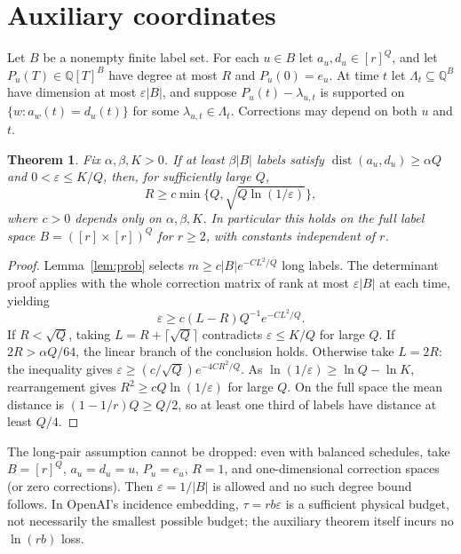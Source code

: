 \documentclass[11pt]{article}
\newtheorem{theorem}{Theorem}
\newcommand{\dist}{\operatorname{dist}}
\begin{document}
\section{Auxiliary coordinates}
Let $B$ be a nonempty finite label set. For each $u\in B$ let $a_u,d_u\in[r]^Q$, and let $P_u(T)\in\mathbb Q[T]^B$ have degree at most $R$ and $P_u(0)=e_u$. At time $t$ let $\Lambda_t\subseteq\mathbb Q^B$ have dimension at most $\varepsilon|B|$, and suppose $P_u(t)-\lambda_{u,t}$ is supported on $\{w:a_w(t)=d_u(t)\}$ for some $\lambda_{u,t}\in\Lambda_t$. Corrections may depend on both $u$ and $t$.
\begin{theorem}\label{thm:aux}
Fix $\alpha,\beta,K>0$. If at least $\beta|B|$ labels satisfy $\dist(a_u,d_u)\ge\alpha Q$ and $0<\varepsilon\le K/Q$, then, for sufficiently large $Q$,
\[R\ge c\min\{Q,\sqrt{Q\ln(1/\varepsilon)}\},\]
where $c>0$ depends only on $\alpha,\beta,K$. In particular this holds on the full label space $B=([r]\times[r])^Q$ for $r\ge2$, with constants independent of $r$.
\end{theorem}
\begin{proof}
Lemma~\ref{lem:prob} selects $m\ge c|B|e^{-CL^2/Q}$ long labels. The determinant proof applies with the whole correction matrix of rank at most $\varepsilon|B|$ at each time, yielding
\[\varepsilon\ge c(L-R)Q^{-1}e^{-CL^2/Q}.\]
If $R<\sqrt Q$, taking $L=R+\lceil\sqrt Q\rceil$ contradicts $\varepsilon\le K/Q$ for large $Q$. If $2R>\alpha Q/64$, the linear branch of the conclusion holds. Otherwise take $L=2R$: the inequality gives $\varepsilon\ge(c/\sqrt Q)e^{-4CR^2/Q}$. As $\ln(1/\varepsilon)\ge\ln Q-\ln K$, rearrangement gives $R^2\ge cQ\ln(1/\varepsilon)$ for large $Q$. On the full space the mean distance is $(1-1/r)Q\ge Q/2$, so at least one third of labels have distance at least $Q/4$.
\end{proof}
The long-pair assumption cannot be dropped: even with balanced schedules, take $B=[r]^Q$, $a_u=d_u=u$, $P_u=e_u$, $R=1$, and one-dimensional correction spaces (or zero corrections). Then $\varepsilon=1/|B|$ is allowed and no such degree bound follows. In OpenAI's incidence embedding, $\tau=rb\varepsilon$ is a sufficient physical budget, not necessarily the smallest possible budget; the auxiliary theorem itself incurs no $\ln(rb)$ loss.
\end{document}
